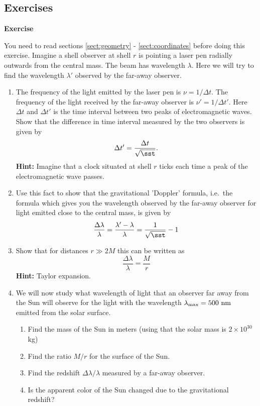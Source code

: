 {\begin{multicols}{2}
\newpage


\section{Exercises}
\newcommand{\newproblem}[1]{\label{#1}{\bf Exercise \refproblem{#1}}}

\newproblem{prob:rdoppler}

You need to read sections \ref{sect:geometry} - \ref{sect:coordinates} before doing this exercise. Imagine a shell observer at shell $r$ is pointing a laser pen radially outwards from the central mass. The beam has wavelength $\lambda$. Here we will try to find the wavelength $\lambda'$ observed by the far-away observer.
\begin{enumerate}
\item The frequency of the light emitted by the laser pen is $\nu=1/\Delta t$. The frequency of the light received by the far-away observer is $\nu'=1/\Delta t'$. Here $\Delta t$ and $\Delta t'$ is the time interval between two peaks of electromagnetic waves. Show that the difference in time interval measured by the two observers is given by
\[
\Delta t'=\frac{\Delta t}{\sqrt{\sst}}.
\]
{\bf Hint:} Imagine that a clock situated at shell $r$ ticks each time a peak of the electromagnetic wave passes.
\item Use this fact to show that the gravitational 'Doppler' formula, i.e.\ the formula which gives you the wavelength observed by the far-away observer for light emitted close to the central mass, is given by
\[
\frac{\Delta\lambda}{\lambda}=\frac{\lambda'-\lambda}{\lambda}=\frac{1}{\sqrt{\sst}}-1
\]
\item Show that for distances $r\gg2M$ this can be written as
\[
\frac{\Delta\lambda}{\lambda}=\frac{M}{r}
\]
{\bf Hint:} Taylor expansion.
\item We will now study what wavelength of light that an observer far away from the Sun will observe for the light with the wavelength $\lambda_\mathrm{max}=500{\rm\ nm}$ emitted from the solar surface.
\begin{enumerate}
\item Find the mass of the Sun in meters (using that the solar mass is $2\times10^{30}$kg)
\item Find the ratio $M/r$ for the surface of the Sun.
\item Find the redshift $\Delta\lambda/\lambda$ measured by a far-away observer.
\item Is the apparent color of the Sun changed due to the gravitational redshift?

\end{enumerate}
\end{enumerate}
\end{multicols}}
